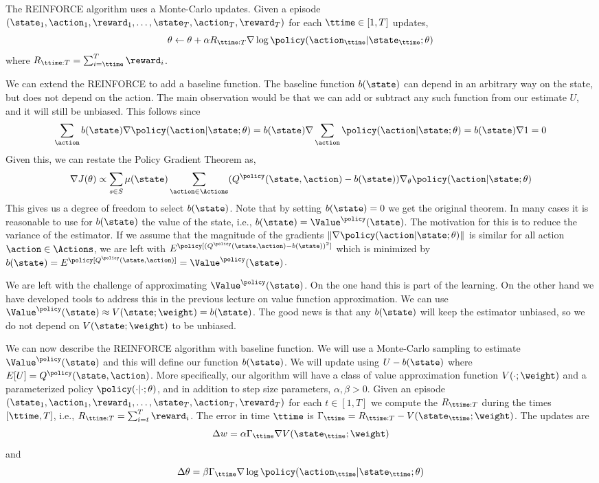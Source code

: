 The REINFORCE algorithm uses a Monte-Carlo updates. Given a episode
$(\state_1,\action_1,\reward_1, \ldots ,
\state_T,\action_T,\reward_T)$ for each $\ttime\in [1,T]$ updates,
\[
\theta\leftarrow \theta+\alpha R_{\ttime:T} \nabla \log
\policy(\action_\ttime|\state_\ttime;\theta)
\]
where $R_{\ttime:T}=\sum_{i=\ttime}^T \reward_i$.

We can extend the REINFORCE to add a baseline function. The baseline
function $b(\state)$ can depend in an arbitrary way on the state,
but does not depend on the action. The main observation would be
that we can add or subtract any such function from our estimate $U$,
and it will still be unbiased. This follows since
\[
\sum_\action b(\state) \nabla
\policy(\action|\state;\theta)=b(\state)\nabla \sum_\action
\policy(\action|\state;\theta)=b(\state)\nabla 1=0
\]
Given this, we can restate the Policy Gradient Theorem as,
\[
\nabla J(\theta)\propto \sum_{s\in S} \mu(\state) \sum_{\action\in
\Actions} (Q^\policy (\state,\action)-b(\state))\nabla_\theta
\policy(\action|\state;\theta)
\]
This gives us a degree of freedom to select $b(\state)$. Note that
by setting $b(\state)=0$ we get the original theorem. In many cases
it is reasonable to use for $b(\state)$ the value of the state,
i.e., $b(\state)=\Value^\policy(\state)$. The motivation for this is
to reduce the variance of the estimator. If we assume that the
magnitude of the gradients $\|\nabla
\policy(\action|\state;\theta)\|$ is similar for all action
$\action\in \Actions$, we are left with $E^\policy
[(Q^\policy(\state,\action)-b(\state))^2]$ which is minimized by
$b(\state)=E^\policy[Q^\policy(\state,\action)]=\Value^\policy(\state)$.

We are left with the challenge of approximating
$\Value^\policy(\state)$. On the one hand this is part of the
learning. On the other hand we have developed tools to address this
in the previous lecture on value function approximation. We can use
$\Value^\policy(\state)\approx V(\state;\weight)=b(\state)$. The
good news is that any $b(\state)$ will keep the estimator unbiased,
so we do not depend on $V(\state;\weight)$ to be unbiased.

We can now describe the REINFORCE algorithm with baseline function.
We will use a Monte-Carlo sampling to estimate
$\Value^\policy(\state)$ and this will define our function
$b(\state)$. We will update using $U-b(\state)$ where
$E[U]=Q^\policy(\state,\action)$. More specifically, our algorithm
will have a class of value approximation function $V(\cdot;\weight)$
and a parameterized policy $\policy(\cdot|\cdot;\theta)$, and in
addition to step size parameters, $\alpha,\beta>0$. Given an episode
$(\state_1,\action_1,\reward_1,
\ldots,\state_T,\action_T,\reward_T)$ for each $t\in [1,T]$ we
compute the $R_{\ttime:T}$ during the times $[\ttime,T]$, i.e.,
$R_{\ttime:T}=\sum_{i=t}^T \reward_i$. The error in time $\ttime$ is
$\Gamma_\ttime=R_{\ttime:T}-V(\state_\ttime;\weight)$. The updates
are
\[
\Delta w=\alpha \Gamma_\ttime \nabla V(\state_\ttime;\weight)
\]
and
\[
\Delta \theta=\beta\Gamma_\ttime \nabla \log
\policy(\action_\ttime|\state_\ttime;\theta)
\]

